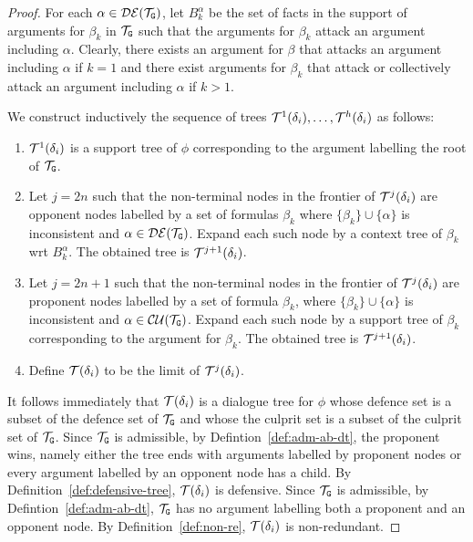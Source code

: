 \begin{proof}
For each $\alpha \in \mathcal{DE}(\mathcal{T}_{\texttt{\textup{G}}})$, let $B^{\alpha}_{k}$ be the set of facts in the support of arguments for $\beta_k$ in $\mathcal{T}_{\texttt{\textup{G}}}$ such that the arguments for $\beta_k$ attack an argument including $\alpha$.
Clearly, there exists an argument for $\beta$ that attacks an argument including $\alpha$ if $k = 1$ and there exist arguments for $\beta_k$ that attack or collectively attack an argument including $\alpha$ if $ k > 1$.

We construct inductively the sequence of trees $\mathcal{T}^{1}(\delta_i), \ldots, \mathcal{T}^{h}(\delta_i)$ as follows:
\begin{enumerate}
    \item $\mathcal{T}^{1}(\delta_i)$ is a support tree of $\phi$ corresponding to the argument labelling the root of $\mathcal{T}_{\texttt{\textup{G}}}$.

    \item  %
    Let $j = 2n$ such that the non-terminal nodes in the frontier of  $\mathcal{T}^{j}(\delta_i)$ are opponent nodes labelled by a set of formulas $\beta_k$ where $\{\beta_k \} \cup \{ \alpha \}$ is inconsistent and  $\alpha \in \mathcal{DE}(\mathcal{T}_{\texttt{\textup{G}}})$.
    Expand each such node by a context tree of $\beta_k$ wrt $B^{\alpha}_{k}$. The obtained tree is $\mathcal{T}^{j+1}(\delta_i)$. 

   
    \item  %
    Let $j = 2n + 1$ such that the non-terminal nodes in the frontier of $\mathcal{T}^{j}(\delta_i)$ are proponent nodes labelled by a set of formula $\beta_k$, where $\{\beta_k \} \cup \{ \alpha \}$ is inconsistent and $\alpha \in \mathcal{CU}(\mathcal{T}_{\texttt{\textup{G}}})$.
    Expand each such node by a support tree of $\beta_k$ corresponding to the argument for $\beta_k$. The obtained tree is $\mathcal{T}^{j+1}(\delta_i)$.

    \item Define $\mathcal{T}(\delta_i)$ to be the limit of $\mathcal{T}^{j}(\delta_i)$.  
\end{enumerate}

It follows immediately that $\mathcal{T}(\delta_i)$ is a dialogue tree for $\phi$ whose defence set is a subset of the defence set of $\mathcal{T}_{\texttt{\textup{G}}}$ and whose the culprit set is a subset of the culprit set of $\mathcal{T}_{\texttt{\textup{G}}}$.
Since $\mathcal{T}_{\texttt{\textup{G}}}$ is admissible, by Defintion~\ref{def:adm-ab-dt}, the proponent wins, namely either the tree ends with arguments labelled by proponent nodes or every argument labelled by an opponent node has a child. By Definition~\ref{def:defensive-tree}, $\mathcal{T}(\delta_i)$ is defensive.
Since $\mathcal{T}_{\texttt{\textup{G}}}$ is admissible,  by Defintion~\ref{def:adm-ab-dt}, $\mathcal{T}_{\texttt{\textup{G}}}$ has no argument labelling both a proponent and an opponent node. By Definition~\ref{def:non-re}, $\mathcal{T}(\delta_i)$ is non-redundant.

\end{proof}

